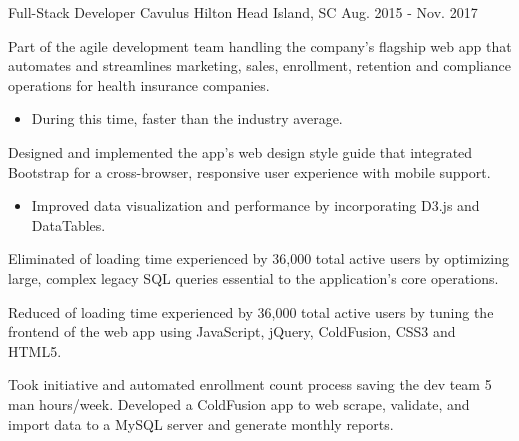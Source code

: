 \begin{cventries}
  \cventry
    {Full-Stack Developer} %
    {Cavulus} %
    {Hilton Head Island, SC} %
    {Aug. 2015 - Nov. 2017} %
    {
      \begin{cvitems} %
        \item {Part of the agile development team handling the company's flagship web app that automates and streamlines marketing, sales, enrollment, retention and compliance operations for health insurance companies.}
        \begin{itemize}
          \vspace{1.0mm}
          \item {During this time,  faster than the industry average.}
        \end{itemize}
        \item {Designed and implemented the app's web design style guide that integrated Bootstrap for a cross-browser, responsive user experience with mobile support.}
        \begin{itemize}
          \vspace{1.0mm}
          \item {Improved data visualization and performance by incorporating D3.js and DataTables.}
        \end{itemize}
        \item {Eliminated  of loading time experienced by 36,000 total active users by optimizing large, complex legacy SQL queries essential to the application's core operations.}
        \item {Reduced  of loading time experienced by 36,000 total active users by tuning the frontend of the web app using JavaScript, jQuery, ColdFusion, CSS3 and HTML5.}
        \item {Took initiative and automated enrollment count process saving the dev team 5 man hours/week. Developed a ColdFusion app to web scrape, validate, and import data to a MySQL server and generate monthly reports.}
      \end{cvitems}
    }


\end{cventries}

